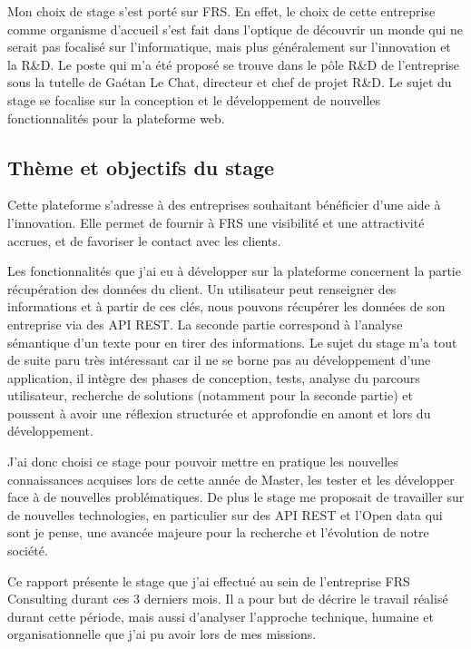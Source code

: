 \documentclass[french]{article}
\begin{document}
{Mon choix de stage s'est porté sur FRS. En effet, le choix de cette entreprise comme organisme d'accueil s'est fait dans l'optique de découvrir un monde qui ne serait pas focalisé sur l'informatique, mais plus généralement sur l'innovation et la R\&D.
\newline{}
Le poste qui m'a été proposé se trouve dans le pôle R\&D de l'entreprise sous la tutelle de Gaétan Le Chat, directeur et chef de projet R\&D. Le sujet du stage se focalise sur la conception et le développement de nouvelles fonctionnalités pour la plateforme web.

\subsection{Thème et objectifs du stage}

Cette plateforme s'adresse à des entreprises souhaitant bénéficier d'une aide à l'innovation. Elle permet de fournir à FRS une visibilité et une attractivité accrues, et de favoriser le contact avec les clients.

Les fonctionnalités que j'ai eu à développer sur la plateforme concernent la partie récupération des données du client. Un utilisateur peut renseigner des informations et à partir de ces clés, nous pouvons récupérer les données de son entreprise via des API REST. La seconde partie correspond à l'analyse sémantique d'un texte pour en tirer des informations.
\newline{}
Le sujet du stage m'a tout de suite paru très intéressant car il ne se borne pas au développement d'une application, il intègre des phases de conception, tests, analyse du parcours utilisateur, recherche de solutions (notamment pour la seconde partie) et poussent à avoir une réflexion structurée et approfondie en amont et lors du développement.

J'ai donc choisi ce stage pour pouvoir mettre en pratique les nouvelles connaissances acquises lors de cette année de Master, les tester et les développer face à de nouvelles problématiques. De plus le stage me proposait de travailler sur de nouvelles technologies, en particulier sur des API REST et l'Open data qui sont je pense, une avancée majeure pour la recherche et l'évolution de notre société.

Ce rapport présente le stage que j'ai effectué au sein de l'entreprise FRS Consulting durant ces 3 derniers mois. Il a pour but de décrire le travail réalisé durant cette période, mais aussi d'analyser l'approche technique, humaine et organisationnelle que j'ai pu avoir lors de mes missions.

}
\end{document}
